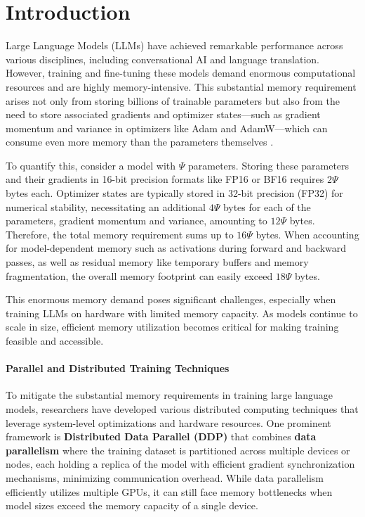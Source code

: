 
\vspace{-8mm}
\section{Introduction}
Large Language Models (LLMs) have achieved remarkable performance across various disciplines, including conversational AI and language translation. However, training and fine-tuning these models demand enormous computational resources and are highly memory-intensive. This substantial memory requirement arises not only from storing billions of trainable parameters but also from the need to store associated gradients and optimizer states—such as gradient momentum and variance in optimizers like Adam and AdamW—which can consume even more memory than the parameters themselves \citep{raffelExploringLimitsTransfer2020,touvronLlamaOpenFoundation2023,chowdheryPaLMScalingLanguage2022}.

To quantify this, consider a model with $\Psi$ parameters. Storing these parameters and their gradients in 16-bit precision formats like FP16 or BF16 requires $2\Psi$ bytes each. Optimizer states are typically stored in 32-bit precision (FP32) for numerical stability, necessitating an additional $4\Psi$ bytes for each of the parameters, gradient momentum and variance, amounting to $12\Psi$ bytes. Therefore, the total memory requirement sums up to $16\Psi$ bytes. When accounting for model-dependent memory such as activations during forward and backward passes, as well as residual memory like temporary buffers and memory fragmentation, the overall memory footprint can easily exceed $18\Psi$ bytes.

This enormous memory demand poses significant challenges, especially when training LLMs on hardware with limited memory capacity. As models continue to scale in size, efficient memory utilization becomes critical for making training feasible and accessible.

% 

\paragraph{Parallel and Distributed Training Techniques}
To mitigate the substantial memory requirements in training large language models, researchers have developed various distributed computing techniques that leverage system-level optimizations and hardware resources. One prominent framework is \textbf{Distributed Data Parallel (DDP)} that combines \textbf{data parallelism} where the training dataset is partitioned across multiple devices or nodes, each holding a replica of the model with efficient gradient synchronization mechanisms, minimizing communication overhead. While data parallelism efficiently utilizes multiple GPUs, it can still face memory bottlenecks when model sizes exceed the memory capacity of a single device.


